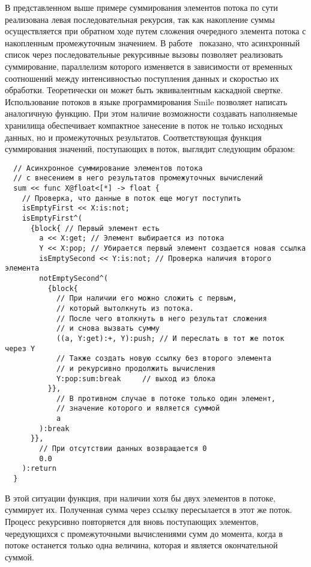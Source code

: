 В представленном выше примере суммирования элементов потока по сути реализована левая последовательная рекурсия, так как накопление суммы осуществляется при обратном ходе путем сложения очередного элемента потока с накопленным промежуточным значением. В работе~\cite{aslist-2006} показано, что асинхронный список через последовательные рекурсивные вызовы позволяет реализовать суммирование, параллелизм которого изменяется в зависимости от временных соотношений между интенсивностью поступления данных и скоростью их обработки. Теоретически он может быть эквивалентным каскадной свертке. Использование потоков в языке программирования Smile позволяет написать аналогичную функцию. При этом наличие возможности создавать наполняемые хранилища обеспечивает компактное занесение в поток не только исходных данных, но и промежуточных результатов. Соответствующая функция суммирования значений, поступающих в поток, выглядит следующим образом:
\begin{verbatim}
  // Асинхронное суммирование элементов потока
  // с внесением в него результатов промежуточных вычислений
  sum << func X@float<[*] -> float {
    // Проверка, что данные в поток еще могут поступить
    isEmptyFirst << X:is:not;
    isEmptyFirst^(
      {block{ // Первый элемент есть
        a << X:get; // Элемент выбирается из потока
        Y << X:pop; // Убирается первый элемент создается новая ссылка
        isEmptySecond << Y:is:not; // Проверка наличия второго элемента
        notEmptySecond^(
          {block{
            // При наличии его можно сложить с первым,
            // который вытолкнуть из потока.
            // После чего втолкнуть в него результат сложения
            // и снова вызвать сумму
            ((a, Y:get):+, Y):push; // И переслать в тот же поток через Y
            // Также создать новую ссылку без второго элемента
            // и рекурсивно продолжить вычисления
            Y:pop:sum:break     // выход из блока
          }},
            // В противном случае в потоке только один элемент,
            // значение которого и является суммой
            a
        ):break
      }},
        // При отсутствии данных возвращается 0
        0.0
    ):return
  }
\end{verbatim}
В этой ситуации функция, при наличии хотя бы двух элементов в потоке, суммирует их. Полученная сумма через ссылку пересылается в этот же поток. Процесс рекурсивно повторяется для вновь поступающих элементов, чередующихся с промежуточными вычислениями сумм до момента, когда в потоке останется только одна величина, которая и является окончательной суммой.

